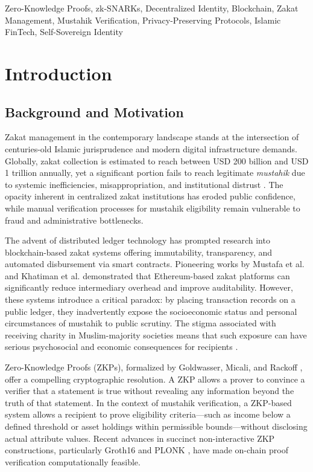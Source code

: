 \documentclass[conference]{IEEEtran}
\begin{document}
\begin{IEEEkeywords}
Zero-Knowledge Proofs, zk-SNARKs, Decentralized Identity, Blockchain, Zakat Management, Mustahik Verification, Privacy-Preserving Protocols, Islamic FinTech, Self-Sovereign Identity
\end{IEEEkeywords}

\section{Introduction}

\subsection{Background and Motivation}

Zakat management in the contemporary landscape stands at the intersection of centuries-old Islamic jurisprudence and modern digital infrastructure demands. Globally, zakat collection is estimated to reach between USD 200 billion and USD 1 trillion annually, yet a significant portion fails to reach legitimate \textit{mustahik} due to systemic inefficiencies, misappropriation, and institutional distrust \cite{worldbank2020}. The opacity inherent in centralized zakat institutions has eroded public confidence, while manual verification processes for mustahik eligibility remain vulnerable to fraud and administrative bottlenecks.

The advent of distributed ledger technology has prompted research into blockchain-based zakat systems offering immutability, transparency, and automated disbursement via smart contracts. Pioneering works by Mustafa et al. \cite{mustafa2021} and Khatiman et al. \cite{khatiman2021} demonstrated that Ethereum-based zakat platforms can significantly reduce intermediary overhead and improve auditability. However, these systems introduce a critical paradox: by placing transaction records on a public ledger, they inadvertently expose the socioeconomic status and personal circumstances of mustahik to public scrutiny. The stigma associated with receiving charity in Muslim-majority societies means that such exposure can have serious psychosocial and economic consequences for recipients \cite{mustafa2021}.

Zero-Knowledge Proofs (ZKPs), formalized by Goldwasser, Micali, and Rackoff \cite{goldwasser1985}, offer a compelling cryptographic resolution. A ZKP allows a prover to convince a verifier that a statement is true without revealing any information beyond the truth of that statement. In the context of mustahik verification, a ZKP-based system allows a recipient to prove eligibility criteria---such as income below a defined threshold or asset holdings within permissible bounds---without disclosing actual attribute values. Recent advances in succinct non-interactive ZKP constructions, particularly Groth16 \cite{groth2016} and PLONK \cite{gabizon2019}, have made on-chain proof verification computationally feasible.
\end{document}
